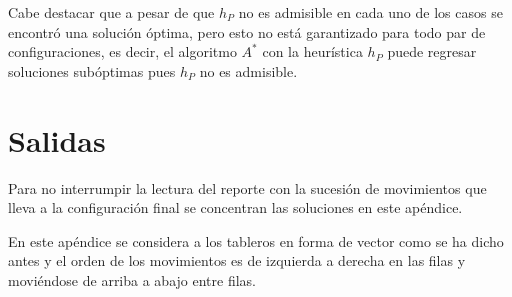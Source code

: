 \documentclass[11pt]{article}
\begin{document}
Cabe destacar que a pesar de que $h_P$ no es admisible en cada uno de los casos se encontró una solución óptima, pero esto no está garantizado para todo par de configuraciones, es decir, el algoritmo $A^*$ con la heurística $h_P$ puede regresar soluciones subóptimas pues $h_P$ no es admisible.

\clearpage

\appendix

\section{Salidas}
\label{salidas}

Para no interrumpir la lectura del reporte con la sucesión de movimientos que lleva a la configuración final se concentran las soluciones en este apéndice.

En este apéndice se considera a los tableros en forma de vector como se ha dicho antes y el orden de los movimientos es de izquierda a derecha en las filas y moviéndose de arriba a abajo entre filas.
\end{document}
